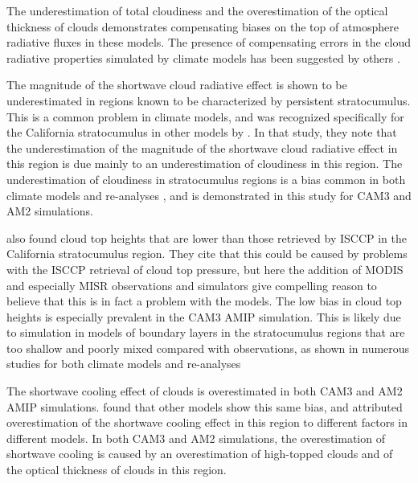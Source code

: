 The underestimation of total cloudiness and the overestimation of the optical thickness of clouds demonstrates compensating biases on the top of atmosphere radiative fluxes in these models. The presence of compensating errors in the cloud radiative properties simulated by climate models has been suggested by others \citep[e.g., ][]{webb_et_al_2001,weare_2004,zhang_et_al_2005}.

The magnitude of the shortwave cloud radiative effect is shown to be underestimated in regions known to be characterized by persistent stratocumulus. This is a common problem in climate models, and was recognized specifically for the California stratocumulus in other models by \cite{webb_et_al_2001}. In that study, they note that the underestimation of the magnitude of the shortwave cloud radiative effect in this region is due mainly to an underestimation of cloudiness in this region. The underestimation of cloudiness in stratocumulus regions is a bias common in both climate models and re-analyses \citep{duynkerke_and_teixeira_2001,bretherton_et_al_2004,siebesma_et_al_2004,stevens_et_al_2007}, and is demonstrated in this study for CAM3 and AM2 simulations.

\cite{webb_et_al_2001} also found cloud top heights that are lower than those retrieved by ISCCP in the California stratocumulus region. They cite that this could be caused by problems with the ISCCP retrieval of cloud top pressure, but here the addition of MODIS and especially MISR observations and simulators give compelling reason to believe that this is in fact a problem with the models. The low bias in cloud top heights is especially prevalent in the CAM3 AMIP simulation. This is likely due to simulation in models of boundary layers in the stratocumulus regions that are too shallow and poorly mixed compared with observations, as shown in numerous studies for both climate models and re-analyses \citep{bretherton_et_al_2004,siebesma_et_al_2004,stevens_et_al_2007,hannay_et_al_2009,medeiros_et_al_2011}

The shortwave cooling effect of clouds is overestimated in both CAM3 and AM2 AMIP simulations. \cite{webb_et_al_2001} found that other models show this same bias, and attributed overestimation of the shortwave cooling effect in this region to different factors in different models. In both CAM3 and AM2 simulations, the overestimation of shortwave cooling is caused by an overestimation of high-topped clouds and of the optical thickness of clouds in this region.

